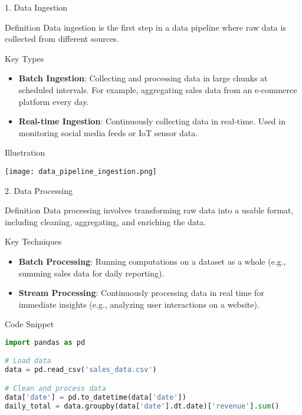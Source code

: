 \documentclass[aspectratio=169]{beamer}
\begin{document}
\begin{frame}[fragile]{1. Data Ingestion}
  \begin{block}{Definition}
    Data ingestion is the first step in a data pipeline where raw data is collected from different sources.
  \end{block}

  \begin{block}{Key Types}
    \begin{itemize}
      \item \textbf{Batch Ingestion}: Collecting and processing data in large chunks at scheduled intervals. For example, aggregating sales data from an e-commerce platform every day.
      \item \textbf{Real-time Ingestion}: Continuously collecting data in real-time. Used in monitoring social media feeds or IoT sensor data.
    \end{itemize}
  \end{block}

  \begin{block}{Illustration}
    \begin{center}
    \texttt{[image: data\_pipeline\_ingestion.png]}
    \end{center}
  \end{block}
\end{frame}

\begin{frame}[fragile]{2. Data Processing}
  \begin{block}{Definition}
    Data processing involves transforming raw data into a usable format, including cleaning, aggregating, and enriching the data.
  \end{block}

  \begin{block}{Key Techniques}
    \begin{itemize}
      \item \textbf{Batch Processing}: Running computations on a dataset as a whole (e.g., summing sales data for daily reporting).
      \item \textbf{Stream Processing}: Continuously processing data in real time for immediate insights (e.g., analyzing user interactions on a website).
    \end{itemize}
  \end{block}

  \begin{block}{Code Snippet}
    \begin{lstlisting}[language=Python, backgroundcolor=\color{lightgray}]
import pandas as pd

# Load data
data = pd.read_csv('sales_data.csv')

# Clean and process data
data['date'] = pd.to_datetime(data['date'])
daily_total = data.groupby(data['date'].dt.date)['revenue'].sum()
    \end{lstlisting}
  \end{block}
\end{frame}
\end{document}

